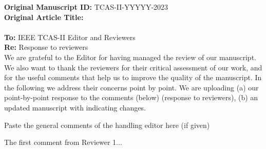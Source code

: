 \documentclass[./IEEE_Journal.tex]{subfiles}
\begin{document}
\onecolumn
\vspace{2mm}
\noindent \textbf{Original Manuscript ID:} TCAS-II-YYYYY-2023  \\  
\textbf{Original Article Title:}   \\
\vspace{2mm}
\\\textbf{To:} IEEE TCAS-II Editor and Reviewers \\
\textbf{Re:} Response to reviewers \\

We are grateful to the Editor for having managed the review of our manuscript. We also want to thank the reviewers for their critical assessment of our work, and for the useful comments that help us to improve the quality of the manuscript.
In the following we address their concerns point by point. 
We are uploading (a) our point-by-point response to the comments (below) (response to reviewers), (b) an updated manuscript with  indicating changes.

\reviewersection 
    Paste the general comments of the handling editor here (if given) \\


\begin{point}
     The first comment from Reviewer 1... \\
\end{point}
\end{document}

